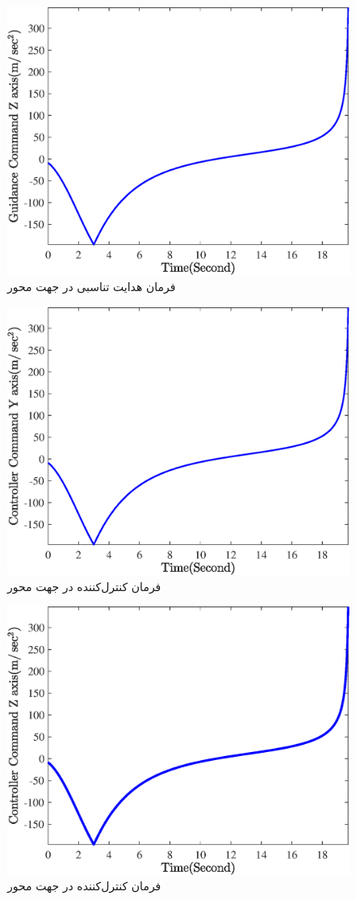 \begin{figure}[H]
	\centering
	\includegraphics[width=.75\linewidth]{../Figure/Q1/a/GC_z}
	\caption{فرمان هدایت تناسبی در جهت محور }
\end{figure}

\begin{figure}[H]
	\centering
	\includegraphics[width=.75\linewidth]{../Figure/Q1/a/CC_y}
	\caption{فرمان کنترل‌کننده در جهت محور }
\end{figure}

\begin{figure}[H]
	\centering
	\includegraphics[width=.75\linewidth]{../Figure/Q1/a/CC_z}
	\caption{فرمان کنترل‌کننده در جهت محور }
\end{figure}

